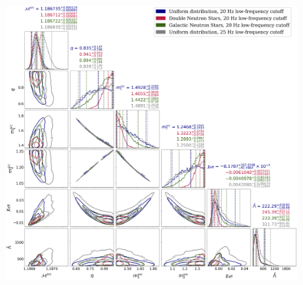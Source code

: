 \begin{figure}
\begin{adjustwidth}{-1.5cm}{-0.8cm}
\centering
  \includegraphics[width=\textwidth]{Figures/common-radius/posteriors_main_bothspins.png}

\end{adjustwidth}
\end{figure}
